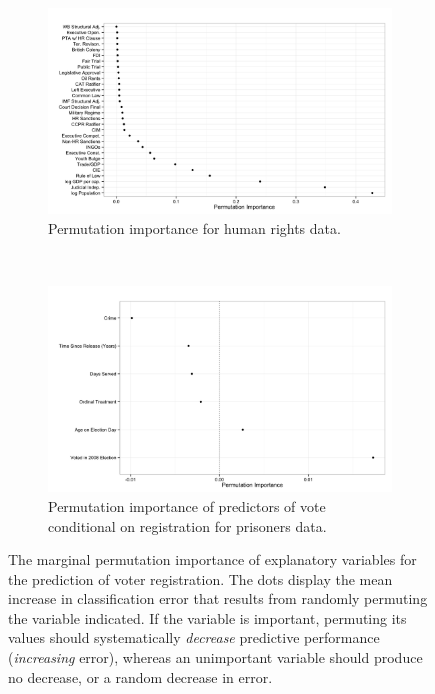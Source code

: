 \begin{figure}
        \centering
        \begin{subfigure}[b]{0.5\textwidth}
                \includegraphics[width=\textwidth]{figures/latent_imp.png}
                \caption{Permutation importance for human rights data.}
                \label{fig:latent_imp}
        \end{subfigure}%
        ~ %
        \begin{subfigure}[b]{0.5\textwidth}
                \includegraphics[width=\textwidth]{figures/imp_cond_vote.png}
                \caption{Permutation importance of predictors of vote conditional on registration for prisoners data.}
                \label{fig:imp_cond_vote}
        \end{subfigure}
        \caption{The marginal permutation importance of explanatory variables for the prediction of voter registration. The dots display the mean increase in classification error that results from randomly permuting the variable indicated. If the variable is important, permuting its values should systematically \textit{decrease} predictive performance (\textit{increasing} error), whereas an unimportant variable should produce no decrease, or a random decrease in error.}
        \label{fig:imp}
\end{figure}
